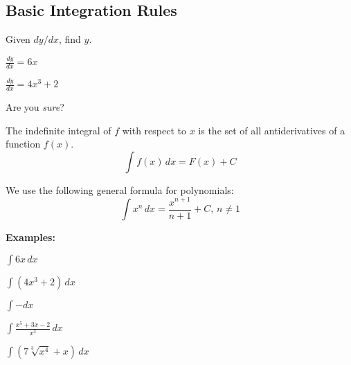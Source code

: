 \subsection*{Basic Integration Rules}
Given $dy/dx$, find $y$.
\begin{questions}
    \begin{minipage}{0.45\linewidth}
        \question $\displaystyle\frac{dy}{dx}=6x$
    \end{minipage}
    \hfill
    \begin{minipage}{0.45\linewidth}
        \question $\displaystyle\frac{dy}{dx}=4x^3+2$
    \end{minipage}
    
\end{questions}
Are you \textit{sure}?


\begin{tcolorbox}[title= DEFINITION OF THE INDEFINITE INTEGRAL,colframe=black,sharp corners,colback=white,colbacktitle=white,coltitle=black,boxrule=1pt]

    The indefinite integral of $f$ with respect to $x$ is the set of all antiderivatives of a function $f(x)$.
    \[\int f(x)\,dx=F(x)+C\]
    
\end{tcolorbox}

\begin{center}
    We use the following general formula for polynomials:
    \[\int x^n\,dx=\frac{x^{n+1}}{n+1}+C,\,n\ne1\]
\end{center}

\noindent\textbf{Examples:}
\begin{questions}
    \question $\displaystyle\int6x\,dx$
    
    \question $\displaystyle\int(4x^3+2)\,dx$
    
    \question $\displaystyle\int-dx$
    
    \question $\displaystyle\int\frac{x^5+3x-2}{x^3}\,dx$
    
    \newpage
    
    \question $\displaystyle\int\left(7\sqrt[3]{x^4}+x\right)\,dx$
\end{questions}

